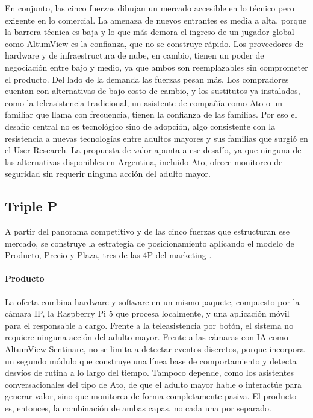 En conjunto, las cinco fuerzas dibujan un mercado accesible en lo técnico pero exigente en lo comercial.
La amenaza de nuevos entrantes es media a alta, porque la barrera técnica es baja y lo que más demora el ingreso de un jugador global como AltumView es la confianza, que no se construye rápido.
Los proveedores de hardware y de infraestructura de nube, en cambio, tienen un poder de negociación entre bajo y medio, ya que ambos son reemplazables sin comprometer el producto.
Del lado de la demanda las fuerzas pesan más.
Los compradores cuentan con alternativas de bajo costo de cambio, y los sustitutos ya instalados, como la teleasistencia tradicional, un asistente de compañía como Ato o un familiar que llama con frecuencia, tienen la confianza de las familias.
Por eso el desafío central no es tecnológico sino de adopción, algo consistente con la resistencia a nuevas tecnologías entre adultos mayores y sus familias que surgió en el User Research.
La propuesta de valor apunta a ese desafío, ya que ninguna de las alternativas disponibles en Argentina, incluido Ato, ofrece monitoreo de seguridad sin requerir ninguna acción del adulto mayor.

\subsection{Triple P}
\label{sec:triple_p}

A partir del panorama competitivo y de las cinco fuerzas que estructuran ese mercado, se construye la estrategia de posicionamiento aplicando el modelo de Producto, Precio y Plaza, tres de las 4P del marketing \parencite{McCarthy1960}.

\paragraph{Producto}
La oferta combina hardware y software en un mismo paquete, compuesto por la cámara IP, la Raspberry Pi 5 que procesa localmente, y una aplicación móvil para el responsable a cargo.
Frente a la teleasistencia por botón, el sistema no requiere ninguna acción del adulto mayor.
Frente a las cámaras con IA como AltumView Sentinare, no se limita a detectar eventos discretos, porque incorpora un segundo módulo que construye una línea base de comportamiento y detecta desvíos de rutina a lo largo del tiempo.
Tampoco depende, como los asistentes conversacionales del tipo de Ato, de que el adulto mayor hable o interactúe para generar valor, sino que monitorea de forma completamente pasiva.
El producto es, entonces, la combinación de ambas capas, no cada una por separado.

